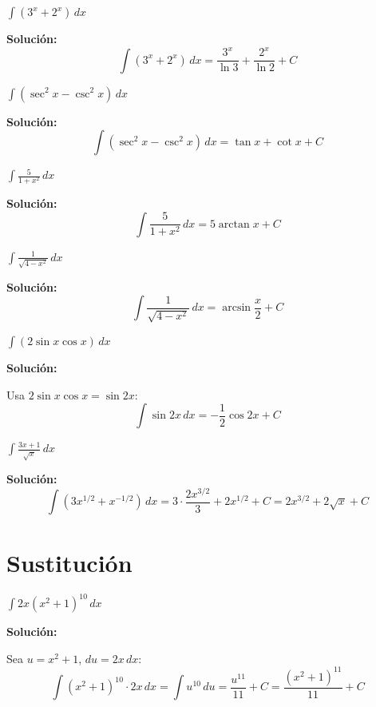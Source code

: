 \documentclass[12pt, a4paper]{book}
\begin{document}
\begin{ejercicio}
$\int (3^x + 2^x) \, dx$
\end{ejercicio}

\textbf{Solución:}
\[
\int (3^x + 2^x) \, dx = \frac{3^x}{\ln 3} + \frac{2^x}{\ln 2} + C
\]

\begin{ejercicio}
$\int (\sec^2 x - \csc^2 x) \, dx$
\end{ejercicio}

\textbf{Solución:}
\[
\int (\sec^2 x - \csc^2 x) \, dx = \tan x + \cot x + C
\]

\begin{ejercicio}
$\int \frac{5}{1+x^2} \, dx$
\end{ejercicio}

\textbf{Solución:}
\[
\int \frac{5}{1+x^2} \, dx = 5\arctan x + C
\]

\begin{ejercicio}
$\int \frac{1}{\sqrt{4 - x^2}} \, dx$
\end{ejercicio}

\textbf{Solución:}
\[
\int \frac{1}{\sqrt{4 - x^2}} \, dx = \arcsin\frac{x}{2} + C
\]

\begin{ejercicio}
$\int (2\sin x \cos x) \, dx$
\end{ejercicio}

\textbf{Solución:}

Usa $2\sin x \cos x = \sin 2x$:
\[
\int \sin 2x \, dx = -\frac{1}{2}\cos 2x + C
\]

\begin{ejercicio}
$\int \frac{3x + 1}{\sqrt{x}} \, dx$
\end{ejercicio}

\textbf{Solución:}
\[
\int (3x^{1/2} + x^{-1/2}) \, dx = 3 \cdot \frac{2x^{3/2}}{3} + 2x^{1/2} + C = 2x^{3/2} + 2\sqrt{x} + C
\]

\section{Sustitución}

\begin{ejercicio}
$\int 2x(x^2 + 1)^{10} \, dx$
\end{ejercicio}

\textbf{Solución:}

Sea $u = x^2 + 1$, $du = 2x \, dx$:
\[
\int (x^2+1)^{10} \cdot 2x \, dx = \int u^{10} \, du = \frac{u^{11}}{11} + C = \frac{(x^2+1)^{11}}{11} + C
\]
\end{document}
